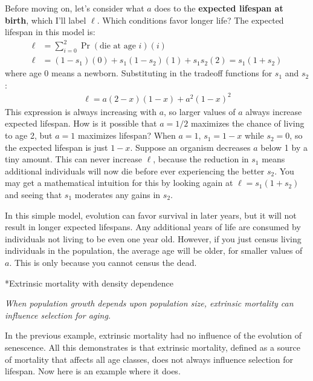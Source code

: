 \documentclass[10pt,reqno]{amsbook}
\makeatletter
\newcommand{\bemph}[1]{{\textbf{\textcolor{bemphcol}{#1}}}}
\renewcommand\section{\@startsection{section}{1}
\z@{.7\linespacing\@plus\linespacing}{.5\linespacing}
{\large\bfseries\itshape}}
\numberwithin{equation}{chapter}
\newenvironment{precis}
{\noi\itshape}
{\vspace{6pt}}
\newcommand{\noi}{\noindent}
\makeatother
\begin{document}
Before moving on, let's consider what $a$ does to the \bemph{expected lifespan at birth}, which I'll label $\ell$. Which conditions favor longer life? The expected lifespan in this model is:
\begin{align*}
	\ell &= \sum_{i=0}^2 \Pr(\text{die at age~}i)(i) \\
	\ell & = (1-s_1)(0) +  s_1 (1-s_2) (1) +  s_1 s_2 (2) = s_1( 1 + s_2 )
\end{align*}
where age 0 means a newborn. Substituting in the tradeoff functions for $s_1$ and $s_2$:
\begin{align*}
	\ell = a (2 - x) (1 - x) + a^2 (1 - x)^2
\end{align*}
This expression is always increasing with $a$, so larger values of $a$ always increase expected lifespan. How is it possible that $a=1/2$ maximizes the chance of living to age 2, but $a=1$ maximizes lifespan? When $a=1$, $s_1=1-x$ while $s_2=0$, so the expected lifespan is just $1-x$. Suppose an organism decreases $a$ below 1 by a tiny amount. %
This can never increase $\ell$, because the reduction in $s_1$ means additional individuals will now die before ever experiencing the better $s_2$. You may get a mathematical intuition for this by looking again at $\ell=s_1(1+s_2)$ and seeing that $s_1$ moderates any gains in $s_2$.

In this simple model, evolution can favor survival in later years, but it will not result in longer expected lifespans. Any additional years of life are consumed by individuals not living to be even one year old. However, if you just census living individuals in the population, the average age will be older, for smaller values of $a$. This is only because you cannot census the dead.


\section*{Extrinsic mortality with density dependence}

\begin{precis}
When population growth depends upon population size, extrinsic mortality can influence selection for aging.
\end{precis}

In the previous example, extrinsic mortality had no influence of the evolution of senescence. All this demonstrates is that extrinsic mortality, defined as a source of mortality that affects all age classes, does not always influence selection for lifespan. Now here is an example where it does. 
\end{document}
